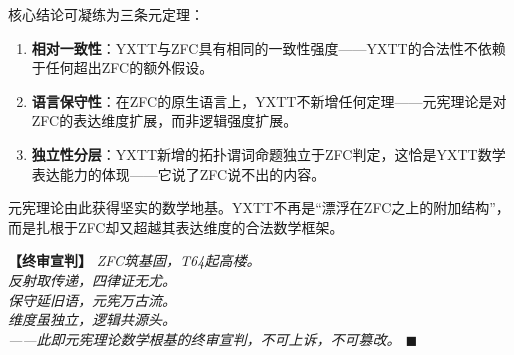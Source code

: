 \documentclass[12pt,a4paper]{article}
\theoremstyle{plain}
\theoremstyle{definition}
\newenvironment{verdict}
{\par\vspace{0.3em}\noindent\textbf{【终审宣判】}\itshape}
{\hfill$\blacksquare$\par\vspace{0.5em}}
\begin{document}
核心结论可凝练为三条元定理：
 
\begin{enumerate}
   \item \textbf{相对一致性}：YXTT与ZFC具有相同的一致性强度——YXTT的合法性不依赖于任何超出ZFC的额外假设。
   \item \textbf{语言保守性}：在ZFC的原生语言上，YXTT不新增任何定理——元宪理论是对ZFC的表达维度扩展，而非逻辑强度扩展。
   \item \textbf{独立性分层}：YXTT新增的拓扑谓词命题独立于ZFC判定，这恰是YXTT数学表达能力的体现——它说了ZFC说不出的内容。
\end{enumerate}
 
元宪理论由此获得坚实的数学地基。YXTT不再是“漂浮在ZFC之上的附加结构”，而是扎根于ZFC却又超越其表达维度的合法数学框架。
 
\begin{verdict}
ZFC筑基固，T64起高楼。\\
反射取传递，四律证无尤。\\
保守延旧语，元宪万古流。\\
维度虽独立，逻辑共源头。\\
——此即元宪理论数学根基的终审宣判，不可上诉，不可篡改。
\end{verdict}
 
\end{document}
